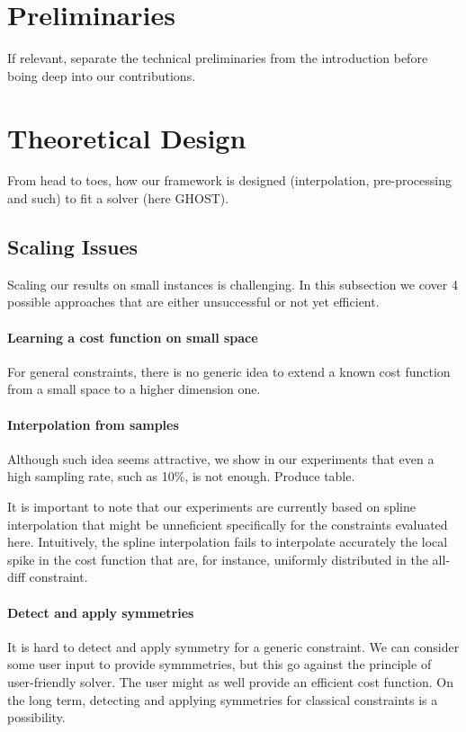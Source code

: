 \documentclass[letterpaper]{article} %
\begin{document}
\section{Preliminaries}\label{sec:preliminaries}
If relevant, separate the technical preliminaries from the introduction before boing deep into our contributions.

\section{Theoretical Design}\label{sec:theory}
From head to toes, how our framework is designed (interpolation, pre-processing and such) to fit a solver (here GHOST).

\subsection{Scaling Issues}\label{subsec:issues}
Scaling our results on small instances is challenging. In this subsection we cover 4 possible approaches that are either unsuccessful or not yet efficient.

\paragraph{Learning a cost function on small space}
For general constraints, there is no generic idea to extend a known cost
function from a small space to a higher dimension one.

\paragraph{Interpolation from samples}
Although such idea seems attractive, we show in our experiments that even a high
sampling rate, such as 10\%, is not enough. Produce table.

It is important to note that our experiments are currently based on spline interpolation that might be unneficient specifically for the constraints evaluated here.
Intuitively, the spline interpolation fails to interpolate accurately the local spike in the cost function that are, for instance, uniformly distributed in the all-diff constraint.

\paragraph{Detect and apply symmetries}
It is hard to detect and apply symmetry for a generic constraint. We can consider some user input to provide symmmetries, but this go against the principle of user-friendly solver. The user might as well provide an efficient cost function.
On the long term, detecting and applying symmetries for classical constraints is a possibility.
\end{document}
